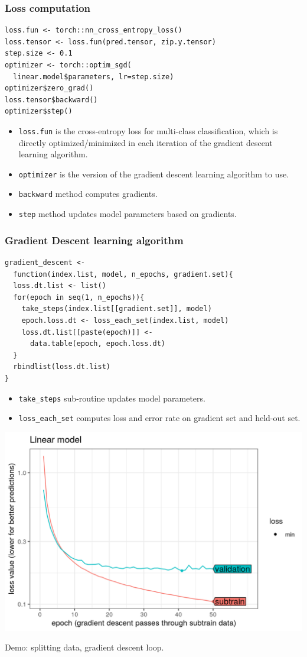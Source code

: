 \documentclass{beamer}
\begin{document}
\begin{frame}[fragile]
\frametitle{Loss computation}
\begin{verbatim}
loss.fun <- torch::nn_cross_entropy_loss()
loss.tensor <- loss.fun(pred.tensor, zip.y.tensor)
step.size <- 0.1
optimizer <- torch::optim_sgd(
  linear.model$parameters, lr=step.size)
optimizer$zero_grad()
loss.tensor$backward()
optimizer$step()
\end{verbatim}
\begin{itemize}
\item \texttt{loss.fun} is the cross-entropy loss for multi-class
  classification, which is directly optimized/minimized in each
  iteration of the gradient descent learning algorithm.
\item \texttt{optimizer} is the version of the gradient descent learning
  algorithm to use.
\item \texttt{backward} method computes gradients.
\item \texttt{step} method updates model parameters based on gradients.
\end{itemize}
\end{frame}

\begin{frame}[fragile]
  \frametitle{Gradient Descent learning algorithm}
\begin{verbatim}
gradient_descent <- 
  function(index.list, model, n_epochs, gradient.set){
  loss.dt.list <- list()
  for(epoch in seq(1, n_epochs)){
    take_steps(index.list[[gradient.set]], model)
    epoch.loss.dt <- loss_each_set(index.list, model)
    loss.dt.list[[paste(epoch)]] <- 
      data.table(epoch, epoch.loss.dt)
  }
  rbindlist(loss.dt.list)
}
\end{verbatim}
  \begin{itemize}
  \item \verb|take_steps| sub-routine updates model parameters.
  \item \verb|loss_each_set| computes loss and error rate on gradient set
    and held-out set.
  \end{itemize}
\end{frame}
 
\begin{frame}
  \includegraphics[width=\textwidth]{figure-validation-loss-linear}

  Demo: splitting data, gradient descent loop.
\end{frame}
 
\end{document}
